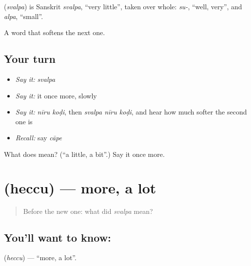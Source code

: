 \begin{cousinweb}
\textbf{} (\emph{svalpa}) is Sanskrit \emph{svalpa}, \textquotedblleft{}very little\textquotedblright{}, taken over whole: \emph{su-}, \textquotedblleft{}well, very\textquotedblright{}, and \emph{alpa}, \textquotedblleft{}small\textquotedblright{}.
\end{cousinweb}

\begin{grammarlens}[title={What you've built}]
A word that softens the next one.
\end{grammarlens}

\subsection*{Your turn}
\begin{itemize}
\raggedright
  \item \emph{Say it:} \emph{svalpa}
  \item \emph{Say it:} it once more, slowly
  \item \emph{Say it:} \emph{nīru koḍi}, then \emph{svalpa nīru koḍi}, and hear how much softer the second one is
  \item \emph{Recall:} say \emph{cāpe}
\end{itemize}

\begin{tcolorbox}[breakable,colback=teal!4,colframe=teal!35!black,title={Before you move on}]
What does  mean? (\textquotedblleft{}a little, a bit\textquotedblright{}.) Say it once more.
\end{tcolorbox}
\section[\texorpdfstring{\kn{ಹೆಚ್ಚು} (heccu)}{ಹೆಚ್ಚು (heccu)}]{ (heccu) — more, a lot}

\label{lesson:KA-C58-more}



\begin{quote}
Before the new one: what did \emph{svalpa} mean?
\end{quote}

\subsection*{You'll want to know: }
\textbf{} (\emph{heccu}) — \textquotedblleft{}more, a lot\textquotedblright{}.

